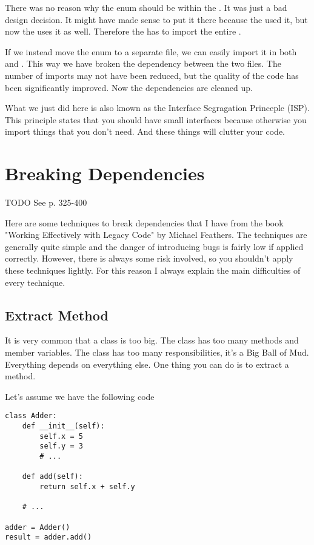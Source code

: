 There was no reason why the  enum should be within the . It was just a bad design decision. It might have made sense to put it there because the  used it, but now the  uses it as well. Therefore the  has to import the entire .

If we instead move the  enum to a separate file, we can easily import it in both  and . This way we have broken the dependency between the two files. The number of imports may not have been reduced, but the quality of the code has been significantly improved. Now the dependencies are cleaned up.

What we just did here is also known as the Interface Segragation Princeple (ISP). This principle states that you should have small interfaces because otherwise you import things that you don't need. And these things will clutter your code.

\section{Breaking Dependencies}

TODO See p. 325-400

Here are some techniques to break dependencies that I have from the book "Working Effectively with Legacy Code" by Michael Feathers. The techniques are generally quite simple and the danger of introducing bugs is fairly low if applied correctly. However, there is always some risk involved, so you shouldn't apply these techniques lightly. For this reason I always explain the main difficulties of every technique.

\subsection{Extract Method}

It is very common that a class is too big. The class has too many methods and member variables. The class has too many responsibilities, it's a Big Ball of Mud. Everything depends on everything else. One thing you can do is to extract a method.

Let's assume we have the following code

\begin{programcode}{}
\begin{verbatim}
class Adder:
    def __init__(self):
        self.x = 5
        self.y = 3
        # ...

    def add(self):
        return self.x + self.y
    
    # ...

adder = Adder()
result = adder.add()
\end{verbatim}
\end{programcode}

